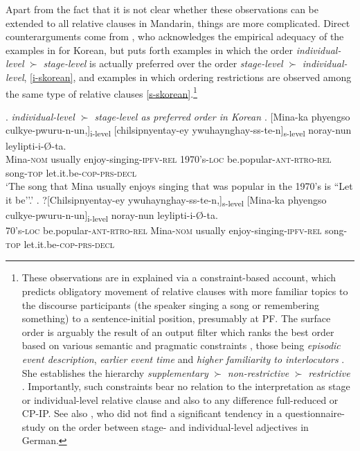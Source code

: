 \documentclass [output=book,colorlinks,citecolor=brown]{langscibook}
\begin{document}
Apart from the fact that it is not clear whether these observations can be extended to all relative clauses in Mandarin, things are more complicated. Direct counterarguments come from \citet{kim:2019:syntax}, who acknowledges the empirical adequacy of the examples in \citet{larson:2004:order} for Korean, but puts forth examples in which the order \textit{individual-level} $\succ$ \textit{stage-level} is actually preferred over the order \textit{stage-level} $\succ$ \textit{individual-level}, \ref{i-skorean}, and examples in which ordering restrictions are observed among the same type of relative clauses \ref{s-skorean}.\footnote{These observations are in \citet{kim:2019:syntax} explained via a constraint-based account, which predicts obligatory movement of relative clauses with more familiar topics to the discourse participants (the speaker singing a song or remembering something) to a sentence-initial position, presumably at PF. The surface order is arguably the result of an output filter \citep{prince:1993:optimality} which ranks the best order based on various semantic and pragmatic constraints \citep[ch. 5]{kim:2019:syntax}, those being \textit{episodic event description}, \textit{earlier event time} and \textit{higher familiarity to interlocutors} \citep[202]{kim:2019:syntax}. She establishes the hierarchy \textit{supplementary} $\succ$ \textit{non-restrictive} $\succ$ \textit{restrictive} \citep[120]{kim:2019:syntax}. Importantly, such constraints bear no relation to the interpretation as stage or individual-level relative clause \citep[239–240]{kim:2019:syntax} and also to any difference full-reduced or CP-IP. See also \citet{kotowski:2016:adj}, who did not find a significant tendency in a questionnaire-study on the order between stage- and individual-level adjectives in German.} %

\newpage

\ex. \emph{individual-level $\succ$ stage-level as preferred order in Korean \citep[85]{kim:2019:syntax}} \label{i-skorean}
\ag. [Mina-ka phyengso culkye-pwuru-n-un,]\textsubscript{i-level} [chilsipnyentay-ey ywuhaynghay-ss-te-n]\textsubscript{s-level} noray-nun leylipti-i-Ø-ta.\\
Mina-\textsc{nom} usually enjoy-singing-\textsc{ipfv-rel} 1970's-\textsc{loc} be.popular-\textsc{ant-rtro-rel} song-\textsc{top} let.it.be-\textsc{cop-prs-decl}\\
`The song that Mina usually enjoys singing that was popular in the 1970's is ``Let it be’’.’
\bg. ?[Chilsipnyentay-ey ywuhaynghay-ss-te-n,]\textsubscript{s-level} [Mina-ka phyengso culkye-pwuru-n-un]\textsubscript{i-level} noray-nun leylipti-i-Ø-ta.\\
 70's-\textsc{loc} be.popular-\textsc{ant-rtro-rel} Mina-\textsc{nom} usually enjoy-singing-\textsc{ipfv-rel} song-\textsc{top} let.it.be-\textsc{cop-prs-decl}\\
\end{document}
